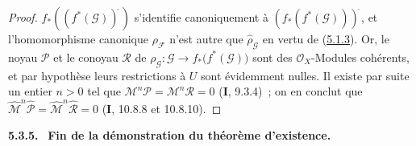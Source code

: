 \begin{proof}
$\widehat f_*((f^*(\mathcal G))^{\widehat{\,}})$ s'identifie canoniquement à
$(f_*(f^*(\mathcal G)))^{\widehat{\,}}$,
et l'homomorphisme canonique $\rho_{\mathcal F}$ n'est autre que
$\widehat{\rho}_{\mathcal G}$ en vertu de
(\hyperref[III.5.1.3-fr]{5.1.3}). Or, le noyau $\mathcal P$ et le conoyau
$\mathcal R$ de
$\rho_{\mathcal G}:\mathcal G\longrightarrow f_*\bigl(f^*(\mathcal G)\bigr)$
sont des $\mathcal O_X$-Modules cohérents, et par hypothèse leurs restrictions à
$U$ sont évidemment nulles. Il existe par suite un entier $n>0$ tel que
$\mathcal M^n\mathcal P=\mathcal M^n\mathcal R=0$ (\textbf{I}, 9.3.4)~; on en conclut que
$\widehat{\mathcal M}^{n}\widehat{\mathcal P}=
\widehat{\mathcal M}^{n}\widehat{\mathcal R}=0$
(\textbf{I}, 10.8.8 et 10.8.10).
\end{proof}

\par\medskip\noindent\textbf{5.3.5.}\ \label{III.5.3.5-fr}
\textbf{Fin de la démonstration du théorème d'existence.}

